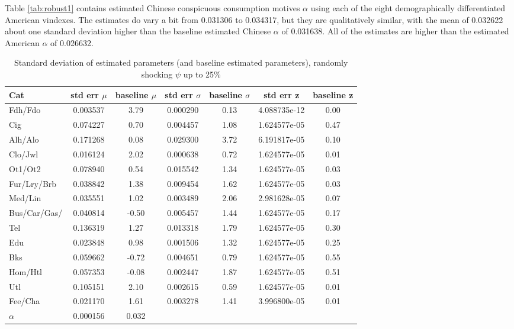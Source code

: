 \documentclass[11pt]{article}
\begin{document}
\begin{CJK}{UTF8}{gbsn}
Table \ref{tab:robust1} contains estimated Chinese conspicuous consumption motives $\alpha$ using each of the eight demographically differentiated American vindexes.  The estimates do vary a bit from 0.031306 to 0.034317, but they are qualitatively similar, with the mean of 0.032622 about one standard deviation higher than the baseline estimated Chinese $\alpha$ of 0.031638.  All of the estimates are higher than the estimated American $\alpha$ of 0.026632.


\begin{table}[ht]
    \centering
\begin{tabular}{lcccccc}
\toprule
Cat &            std err $\mu$ & baseline $\mu$ & std err $\sigma$ & baseline $\sigma$ & std err z  & baseline z \\
\midrule
Fdh/Fdo          &  0.003537 & 3.79 &  0.000290 & 0.13 &  4.088735e-12 & 0.00\\
Cig              &  0.074227 & 0.70 &  0.004457 & 1.08 &  1.624577e-05 & 0.47\\
Alh/Alo          &  0.171268 & 0.08 &  0.029300 & 3.72 &  6.191817e-05 & 0.10\\
Clo/Jwl          &  0.016124 & 2.02 &  0.000638 & 0.72 &  1.624577e-05 & 0.01\\
Ot1/Ot2          &  0.078940 & 0.54 &  0.015542 & 1.34 &  1.624577e-05 & 0.03\\
Fur/Lry/Brb      &  0.038842 & 1.38 &  0.009454 & 1.62 &  1.624577e-05 & 0.03\\
Med/Lin          &  0.035551 & 1.02 &  0.003489 & 2.06 &  2.981628e-05 & 0.07\\
Bus/Car/Gas/\*   &  0.040814 & -0.50&  0.005457 & 1.44 &  1.624577e-05 & 0.17\\
Tel              &  0.136319 & 1.27 &  0.013318 & 1.79 &  1.624577e-05 & 0.30\\
Edu              &  0.023848 & 0.98 &  0.001506 & 1.32 &  1.624577e-05 & 0.25\\
Bks              &  0.059662 & -0.72&  0.004651 & 0.79 &  1.624577e-05 & 0.55\\
Hom/Htl          &  0.057353 & -0.08&  0.002447 & 1.87 &  1.624577e-05 & 0.51\\
Utl              &  0.105151 & 2.10 &  0.002615 & 0.59 &  1.624577e-05 & 0.01\\
Fee/Cha          &  0.021170 & 1.61 &  0.003278 & 1.41 &  3.996800e-05 & 0.01\\
\midrule
$\alpha$         & 0.000156  & 0.032 & & & &\\
\bottomrule
		\hline
\end{tabular}
\caption{Standard deviation of estimated parameters (and baseline estimated parameters), randomly shocking $\psi$ up to 25\%}
\label{tab:robust2}
\end{table}


\end{CJK}
\end{document}
